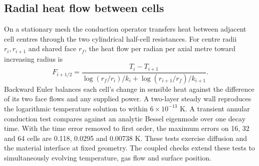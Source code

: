 \subsection{Radial heat flow between cells}
On a stationary mesh the conduction operator transfers heat between adjacent
cell centres through the two cylindrical half-cell resistances. For centre
radii $r_i,r_{i+1}$ and shared face $r_f$, the heat flow per radian per axial
metre toward increasing radius is
\[
 F_{i+1/2}=\frac{T_i-T_{i+1}}{\log(r_f/r_i)/k_i+\log(r_{i+1}/r_f)/k_{i+1}} .
\]
Backward Euler balances each cell's change in sensible heat against the
difference of its two face flows and any supplied power. A two-layer steady
wall reproduces the logarithmic temperature solution to within
$6\times10^{-13}$ K. A transient annular conduction test compares against an
analytic Bessel eigenmode over one decay time. With the time error removed to
first order, the maximum errors on 16, 32 and 64 cells are 0.118, 0.0295 and
0.00738 K. These tests exercise diffusion and the material interface at fixed
geometry. The coupled checks extend these tests to simultaneously evolving temperature,
gas flow and surface position.

